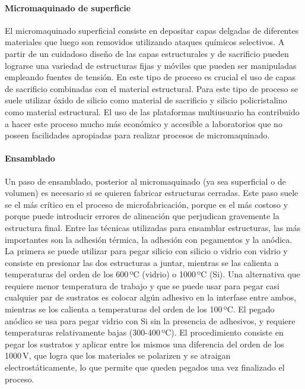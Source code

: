 \documentclass[a4paper, 12pt]{article}
\begin{document}
\paragraph*{Micromaquinado de superficie}
El micromaquinado superficial consiste en depositar capas delgadas de diferentes materiales que luego son removidos utilizando ataques químicos selectivos. A partir de un cuidadoso diseño de las capas estructurales y de sacrificio pueden lograrse una variedad de estructuras fijas y móviles que pueden ser manipuladas empleando fuentes de tensión. En este tipo de proceso es crucial el uso de capas de sacrificio combinadas con el material estructural. Para este tipo de proceso se suele utilizar óxido de silicio como material de sacrificio y silicio policristalino como material estructural. El uso de las plataformas multiusuario\cite{Koester1999} ha contribuido a hacer este proceso mucho más económico y accesible a laboratorios que no poseen facilidades apropiadas para realizar procesos de micromaquinado.

\paragraph*{Ensamblado}
Un paso de ensamblado, posterior al micromaquinado (ya sea superficial o de vo\-lu\-men) es necesario si se quieren fabricar estructuras cerradas. Este paso suele se el más crítico en el proceso de microfabricación, porque es el más costoso y porque puede introducir errores de alineación que perjudican gravemente la estructura final. Entre las técnicas utilizadas para ensamblar estructuras, las más importantes son la adhesión térmica, la adhesión con pegamentos y la anódica. La primera se puede utilizar para pegar silicio con silicio o vidrio con vidrio y consiste en presionar las dos estructuras a juntar, mientras se las calienta a temperaturas del orden de los 600\,ºC (vidrio) o 1000\,ºC (Si). Una alternativa que requiere menor temperatura de trabajo y que se puede usar para pegar casi cualquier par de sustratos es colocar algún adhesivo en la interfase entre ambos, mientras se los calienta a temperaturas del orden de los 100\,ºC. El pegado anódico se usa para pegar vidrio con Si sin la presencia de adhesivos, y requiere temperaturas relativamente bajas (300-400\,ºC). El procedimiento consiste en pegar los sustratos y aplicar entre los mismos una diferencia del orden de los 1000\,V, que logra que los materiales se polarizen y se atraigan electrostáticamente, lo que permite que queden pegados una vez finalizado el proceso.
\end{document}
